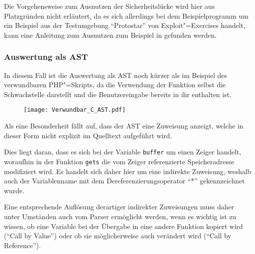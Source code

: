             Die Vorgehensweise zum Ausnutzen der Sicherheitslücke wird hier aus Platzgründen nicht erläutert,
            da es sich allerdings bei dem Beispielprogramm um ein Beispiel aus der Testumgebung
            \foreignquote{english}{Protostar} von Exploit"=Exercises handelt,
            kann eine Anleitung zum Ausnutzen zum Beispiel in
            \cite{Andreko2011} gefunden werden.

            \subsubsection{Auswertung als AST}
                In diesem Fall ist die Auswertung als
                \gls{AST} noch kürzer als im Beispiel des verwundbaren
                \gls{PHP}"=Skripts,
                da die Verwendung der Funktion selbst die Schwachstelle darstellt und
                die Benutzereingabe bereits in ihr enthalten ist.

                \begin{figure}[htp]
                    \centering%
                    \texttt{[image: Verwundbar\_C\_AST.pdf]}
                    \label{fig:Verwundbar_C_AST}
                \end{figure}

                Als eine Besonderheit fällt auf,
                dass der
                \gls{AST} eine Zuweisung anzeigt,
                welche in dieser Form nicht explizit im Quelltext aufgeführt wird.

                Dies liegt daran,
                dass es sich bei der Variable
                \lstinline{buffer} um einen Zeiger handelt,
                woraufhin in der Funktion
                \lstinline{gets} die vom Zeiger referenzierte Speicheradresse modifiziert wird.
                Es handelt sich daher hier um eine indirekte Zuweisung,
                weshalb auch der Variablenname mit dem Dereferenzierungsoperator
                \enquote{*} gekennzeichnet wurde.

                Eine entsprechende Auflösung derartiger indirekter Zuweisungen muss daher unter Umständen auch vom Parser ermöglicht werden,
                wenn es wichtig ist zu wissen,
                ob eine Variable bei der Übergabe in eine andere Funktion kopiert wird
                (\foreignquote{english}{Call by Value}) oder
                ob sie möglicherweise auch verändert wird
                (\foreignquote{english}{Call by Reference}).

